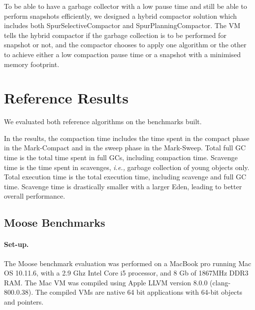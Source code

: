 \documentclass[10pt, sigplan]{acmart}
\begin{document}
To be able to have a garbage collector with a low pause time and still be able to perform snapshots efficiently, we designed a hybrid compactor solution which includes both SpurSelectiveCompactor and SpurPlanningCompactor. The VM tells the hybrid compactor if the garbage collection is to be performed for snapshot or not, and the compactor chooses to apply one algorithm or the other to achieve either a low compaction pause time or a snapshot with a minimised memory footprint.

\section{Reference Results} \label{sec:valid}

We evaluated both reference algorithms on the benchmarks built. 

In the results, the compaction time includes the time spent in the compact phase in the Mark-Compact and in the sweep phase in the Mark-Sweep. Total full GC time is the total time spent in full GCs, including  compaction time. Scavenge time is the time spent in scavenges, \emph{i.e.,} garbage collection of young objects only. Total execution time is the total execution time, including scavenge and full GC time. Scavenge time is drastically smaller with a larger Eden, leading to better overall performance.

\subsection{Moose Benchmarks}


\paragraph{Set-up.}The Moose benchmark evaluation was performed on a MacBook pro running Mac OS 10.11.6, with a 2.9 Ghz Intel Core i5 processor, and 8 Gb of  1867MHz DDR3 RAM. The Mac VM was compiled using Apple LLVM version 8.0.0 (clang-800.0.38). The compiled VMs are native 64 bit applications with 64-bit objects and pointers.
\end{document}
